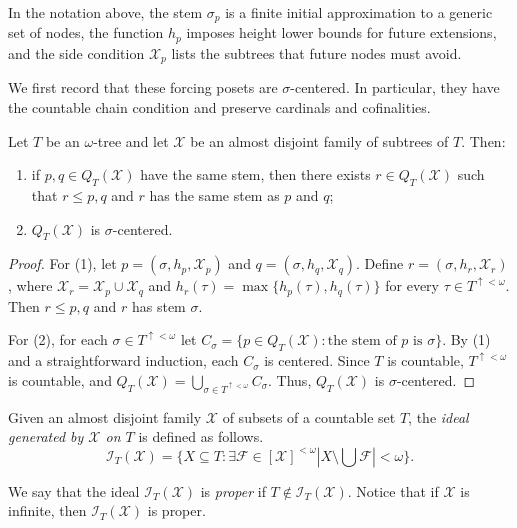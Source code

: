In the notation above, the stem $\sigma_p$ is a finite initial approximation to a generic set of nodes, the
function $h_p$ imposes height lower bounds for future extensions, and the side
condition $\mathcal X_p$ lists the subtrees that future nodes must avoid.

We first record that these forcing posets are $\sigma$-centered.  In particular,
they have the countable chain condition and preserve cardinals and cofinalities.
\begin{lemma}\label{lem:QT-sigma-centered}
Let $T$ be an $\omega$-tree and let $\mathcal X$ be an almost disjoint family of subtrees of $T$. Then:
\begin{enumerate}[label=(\arabic*)]
    \item if $p,q\in Q_T(\mathcal X)$ have the same stem, then there exists
    $r\in Q_T(\mathcal X)$ such that $r\leq p,q$ and $r$ has the same stem as
    $p$ and $q$;
    \item $Q_T(\mathcal X)$ is $\sigma$-centered.
\end{enumerate}
\end{lemma}

\begin{proof}
For (1), let $p=(\sigma,h_p,\mathcal X_p)$ and
$q=(\sigma,h_q,\mathcal X_q)$.
Define $r=(\sigma,h_r,\mathcal X_r)$, where
$\mathcal X_r=\mathcal X_p\cup\mathcal X_q$ and $h_r(\tau)=\max\{h_p(\tau),h_q(\tau)\}$ for every $\tau\in T^{\uparrow<\omega}$.
Then $r\leq p,q$ and $r$ has stem $\sigma$.

For (2), for each $\sigma\in T^{\uparrow<\omega}$ let $C_\sigma=\{p\in Q_T(\mathcal X):\text{the stem of }p\text{ is }\sigma\}$.
By (1) and a straightforward induction, each $C_\sigma$ is centered.
Since $T$ is countable, $T^{\uparrow<\omega}$ is countable, and $Q_T(\mathcal X)=\bigcup_{\sigma\in T^{\uparrow<\omega}}C_\sigma$.
Thus, $Q_T(\mathcal X)$ is $\sigma$-centered.
\end{proof}

Given an almost disjoint family $\mathcal X$ of subsets of a countable set $T$,
the \emph{ideal generated by $\mathcal X$ on $T$} is defined as follows.
\[
  \mathcal I_T(\mathcal X)
  =
  \{X\subseteq T:
    \exists\mathcal F\in[\mathcal X]^{<\omega}
    |X\setminus\bigcup\mathcal F|<\omega\}.
\]

We say that the ideal $\mathcal I_T(\mathcal X)$ is \emph{proper} if $T\notin\mathcal I_T(\mathcal X)$.
Notice that if $\mathcal X$ is infinite, then $\mathcal I_T(\mathcal X)$ is proper.

